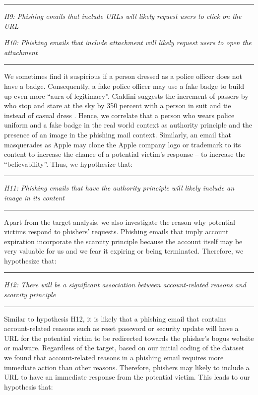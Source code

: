 \rule[0.5ex]{1\columnwidth}{1pt}

\textit{H9: Phishing emails that include URLs will likely request
users to click on the URL}

\textit{H10: Phishing emails that include attachment will likely request
users to open the attachment}

\rule[0.5ex]{1\columnwidth}{1pt}

We sometimes find it suspicious if a person dressed as a police officer
does not have a badge. Consequently, a fake police officer may use
a fake badge to build up even more \textquotedblleft aura of legitimacy\textquotedblright .
Cialdini suggests the increment of passers-by who stop and stare at
the sky by 350 percent with a person in suit and tie instead of casual
dress \cite{cialdini:2001}. Hence, we correlate that a person who
wears police uniform and a fake badge in the real world context as
authority principle and the presence of an image in the phishing mail
context. Similarly, an email that masquerades as Apple may clone the
Apple company logo or trademark to its content to increase the chance
of a potential victim's response -- to increase the \textquotedblleft believability\textquotedblright .
Thus, we hypothesize that:

\rule[0.5ex]{1\columnwidth}{1pt}

\textit{H11: Phishing emails that have the authority principle will
likely include an image in its content}

\rule[0.5ex]{1\columnwidth}{1pt}

Apart from the target analysis, we also investigate the reason why
potential victims respond to phishers' requests. Phishing emails that
imply account expiration incorporate the scarcity principle because
the account itself may be very valuable for us and we fear it expiring
or being terminated. Therefore, we hypothesize that:

\rule[0.5ex]{1\columnwidth}{1pt}

\textit{H12: There will be a significant association between account-related
reasons and scarcity principle }

\rule[0.5ex]{1\columnwidth}{1pt}

Similar to hypothesis H12, it is likely that a phishing email that
contains account-related reasons such as reset password or security
update will have a URL for the potential victim to be redirected towards
the phisher's bogus website or malware. Regardless of the target,
based on our initial coding of the dataset we found that account-related
reasons in a phishing email requires more immediate action than other
reasons. Therefore, phishers may likely to include a URL to have an
immediate response from the potential victim. This leads to our hypothesis
that:

